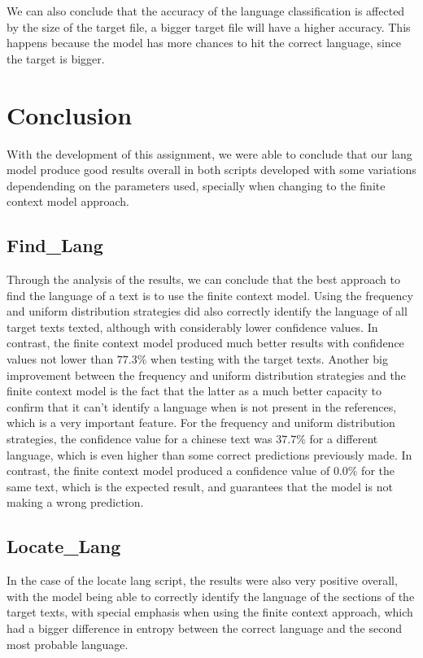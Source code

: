 \documentclass{article}
\begin{document}
We can also conclude that the accuracy of the language classification is affected by the size of the target file, 
a bigger target file will have a higher accuracy.
This happens because the model has more chances to hit the correct language, since the target is bigger.

\section{Conclusion}
\label{sec:conclusion}

With the development of this assignment, we were able to conclude that our lang model
produce good results overall in both scripts developed with some variations dependending on the
parameters used, specially when changing to the finite context model approach.

\subsection{Find_Lang}
\label{subsec:conclusion:find_lang}

Through the analysis of the results, we can conclude that the best approach to find the language of a text is to use the finite context model.
Using the frequency and uniform distribution strategies did also correctly identify the language of all target texts texted, although with considerably lower confidence values.
In contrast, the finite context model produced much better results with confidence values not lower than $77.3\%$ when testing with the target texts.
Another big improvement between the frequency and uniform distribution strategies and the finite context model is the fact that the latter as a much better capacity to confirm
that it can't identify a language when is not present in the references, which is a very important feature. For the frequency and uniform distribution strategies, the confidence
value for a chinese text was $37.7\%$ for a different language, which is even higher than some correct predictions previously made. In contrast, the finite context model produced a
confidence value of $0.0\%$ for the same text, which is the expected result, and guarantees that the model is not making a wrong prediction.

\subsection{Locate_Lang}
\label{subsec:conclusion:locate_lang}

In the case of the locate lang script, the results were also very positive overall, with the model being able to correctly identify the language of the sections of the target texts,
with special emphasis when using the finite context approach, which had a bigger difference in entropy between the correct language and the second most probable language.
\end{document}
